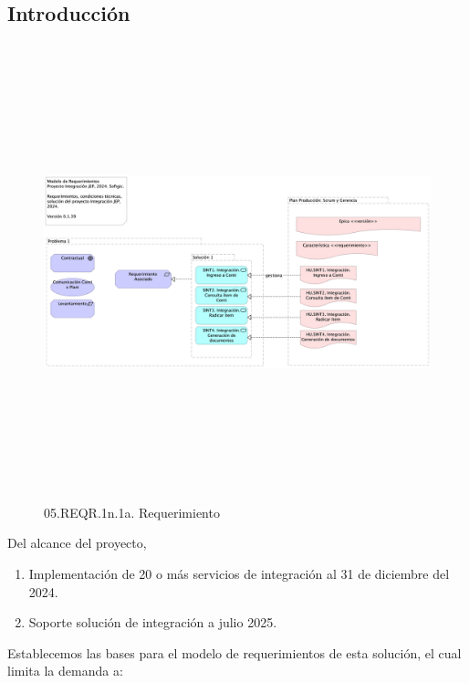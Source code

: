 \documentclass[
  paper=a4,
  ,captions=tableheading
]{scrartcl}
\providecommand{\tightlist}{%
  \setlength{\itemsep}{0pt}\setlength{\parskip}{0pt}}
\begin{document}
\subsection{Introducción}\label{sec:introducciuxf3n}

\begin{figure}
\centering
\includegraphics[width=\textwidth,height=5.20833in]{03.1a.contd.vista.png}
\caption{05.REQR.1n.1a. Requerimiento}
\end{figure}

Del alcance del proyecto,

\begin{enumerate}
\def\labelenumi{\arabic{enumi}.}
\tightlist
\item
  Implementación de 20 o más servicios de integración al 31 de diciembre
  del 2024.
\item
  Soporte solución de integración a julio 2025.
\end{enumerate}

Establecemos las bases para el modelo de requerimientos de esta
solución, el cual limita la demanda a:
\end{document}

